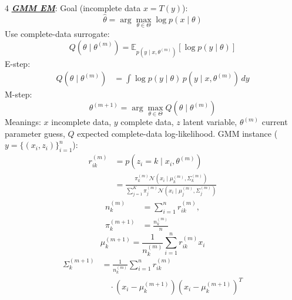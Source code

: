 \documentclass[12pt]{article}
\newcommand{\bulletPoint}[1]{\ul{\textit{\textbf{#1}}}}
\begin{document}
\begin{multicols*}{4}
\bulletPoint{GMM EM}:
Goal (incomplete data $x=T(y)$):
\useshortskip \begin{equation*}
    \hat{\theta}=\arg\max_{\theta\in\Theta}\log p(x\mid\theta)
\end{equation*}
Use complete-data surrogate:
\useshortskip \begin{equation*}
    Q(\theta\mid\theta^{(m)})=
    \mathbb{E}_{p(y\mid x,\theta^{(m)})}\!\left[\log p(y\mid\theta)\right]
\end{equation*}
E-step:
\useshortskip \begin{equation*}
    \begin{split}
        Q(\theta\mid\theta^{(m)})
        &=\int \log p(y\mid\theta)\,p(y\mid x,\theta^{(m)})\,dy
    \end{split}
\end{equation*}
M-step:
\useshortskip \begin{equation*}
    \theta^{(m+1)}=\arg\max_{\theta\in\Theta}Q(\theta\mid\theta^{(m)})
\end{equation*}
Meanings: $x$ incomplete data, $y$ complete data, $z$ latent variable, $\theta^{(m)}$ current parameter guess, $Q$ expected complete-data log-likelihood.
GMM instance ($y=\{(x_i,z_i)\}_{i=1}^{n}$):
\useshortskip \begin{equation*}
    \begin{split}
        r_{ik}^{(m)}&=p(z_i=k\mid x_i,\theta^{(m)})\\
        &=\frac{\pi_k^{(m)}\mathcal{N}(x_i\mid\mu_k^{(m)},\Sigma_k^{(m)})}
        {\sum_{j=1}^{K}\pi_j^{(m)}
        \mathcal{N}(x_i\mid\mu_j^{(m)},\Sigma_j^{(m)})}
    \end{split}
\end{equation*}
\useshortskip \begin{equation*}
    \begin{split}
        n_k^{(m)}&=\sum_{i=1}^{n}r_{ik}^{(m)},\\
        \pi_k^{(m+1)}&=\frac{n_k^{(m)}}{n}
    \end{split}
\end{equation*}
\useshortskip \begin{equation*}
    \mu_k^{(m+1)}=\frac{1}{n_k^{(m)}}\sum_{i=1}^{n}r_{ik}^{(m)}x_i
\end{equation*}
\useshortskip \begin{equation*}
    \begin{split}
        \Sigma_k^{(m+1)}
        &=\frac{1}{n_k^{(m)}}\sum_{i=1}^{n}r_{ik}^{(m)}\\
        &\quad\cdot (x_i-\mu_k^{(m+1)})(x_i-\mu_k^{(m+1)})^T

\end{split}
\end{equation*}
\end{multicols*}
\end{document}
